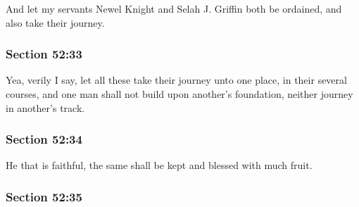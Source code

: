 		And let my servants Newel Knight and Selah J. Griffin both be ordained, and also take their journey.


	\subsubsection{Section 52:33} %
		\label{DC52-33}

		Yea, verily I say, let all these take their journey unto one place, in their several courses, and one man shall not build upon another's foundation, neither journey in another's track.


	\subsubsection{Section 52:34} %
		\label{DC52-34}

		He that is faithful, the same shall be kept and blessed with much fruit.


	\subsubsection{Section 52:35} %
		\label{DC52-35}

